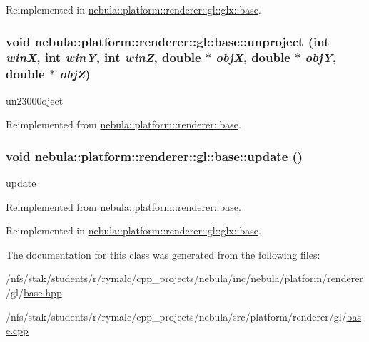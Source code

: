 Reimplemented in \hyperlink{classnebula_1_1platform_1_1renderer_1_1gl_1_1glx_1_1base_ae401e12e3f15975e9cf09723b3617341}{nebula::platform::renderer::gl::glx::base}.\hypertarget{classnebula_1_1platform_1_1renderer_1_1gl_1_1base_a6f060e673e035fb037517423351ae11c}{
\subsubsection[{unproject}]{\setlength{\rightskip}{0pt plus 5cm}void nebula::platform::renderer::gl::base::unproject (int {\em winX}, \/  int {\em winY}, \/  int {\em winZ}, \/  double $\ast$ {\em objX}, \/  double $\ast$ {\em objY}, \/  double $\ast$ {\em objZ})}}
\label{classnebula_1_1platform_1_1renderer_1_1gl_1_1base_a6f060e673e035fb037517423351ae11c}


un23000oject 

Reimplemented from \hyperlink{classnebula_1_1platform_1_1renderer_1_1base_a29759f9e2d0ac477b16ad27dc8aa4f0f}{nebula::platform::renderer::base}.\hypertarget{classnebula_1_1platform_1_1renderer_1_1gl_1_1base_a9f5ba209a04711ace2516875da5c1aa3}{
\subsubsection[{update}]{\setlength{\rightskip}{0pt plus 5cm}void nebula::platform::renderer::gl::base::update ()}}
\label{classnebula_1_1platform_1_1renderer_1_1gl_1_1base_a9f5ba209a04711ace2516875da5c1aa3}


update 

Reimplemented from \hyperlink{classnebula_1_1platform_1_1renderer_1_1base_aa8290b3d6ac2b1908d44489002876723}{nebula::platform::renderer::base}.

Reimplemented in \hyperlink{classnebula_1_1platform_1_1renderer_1_1gl_1_1glx_1_1base_a7d641192feb417180195053cd58dcf7d}{nebula::platform::renderer::gl::glx::base}.

The documentation for this class was generated from the following files:\begin{DoxyCompactItemize}
\item 
/nfs/stak/students/r/rymalc/cpp\_\-projects/nebula/inc/nebula/platform/renderer/gl/\hyperlink{inc_2nebula_2platform_2renderer_2gl_2base_8hpp}{base.hpp}\item 
/nfs/stak/students/r/rymalc/cpp\_\-projects/nebula/src/platform/renderer/gl/\hyperlink{src_2platform_2renderer_2gl_2base_8cpp}{base.cpp}\end{DoxyCompactItemize}
